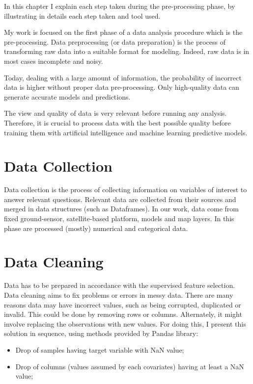 In this chapter I explain each step taken during the pre-processing phase, by illustrating in details each step taken and tool used. \newline
\par
My work is focused on the first phase of a data analysis procedure which is the pre-processing.
Data preprocessing (or data preparation) is the process of transforming raw data into a suitable format for modeling. 
Indeed, raw data is in most cases incomplete and noisy.\par
Today, dealing with a large amount of information, the probability of incorrect data is higher without proper data pre-processing.
Only high-quality data can generate accurate models and predictions. \par
The view and quality of data is very relevant before running any analysis.
Therefore, it is crucial to process data with the best possible quality before training them with artificial intelligence and machine learning predictive models.\par
\section{Data Collection}
Data collection is the process of collecting information on variables of interest to answer relevant questions. \newline
Relevant data are collected from their sources and merged in data structures (such as Dataframes). In our work, data come from fixed ground-sensor, satellite-based platform, models and map layers. In this phase are processed (mostly) numerical and categorical data. 
\section{Data Cleaning}
\label{sec:Data cleaning}
Data has to be prepared in accordance with the supervised feature selection.
Data cleaning aims to fix problems or errors in messy data. There are many reasons data may have incorrect values, such as being corrupted, duplicated or invalid. \newline
This could be done by removing rows or columns. Alternately, it might involve replacing the observations with new values. \newline
For doing this, I present this solution in sequence, using methods provided by Pandas library:
\begin{itemize}
\item Drop of samples having target variable with NaN value;
\item Drop of columns (values assumed by each covariates) having at least a NaN value;
\end{itemize}
